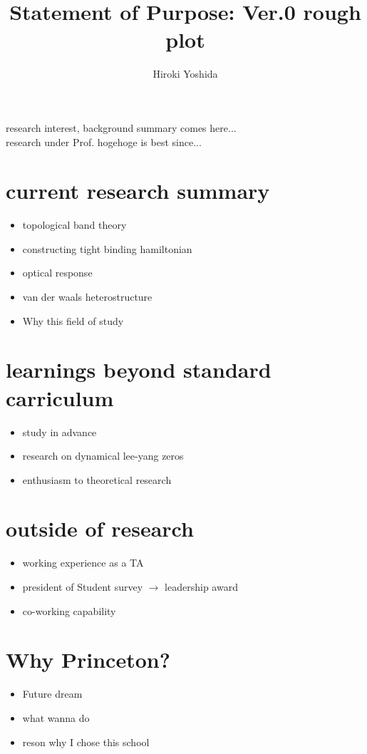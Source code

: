 \documentclass[a4]{article}
\title{Statement of Purpose: Ver.0 rough plot}
\author{Hiroki Yoshida}
\date{}
\begin{document}
\maketitle
research interest, background summary comes here...\\
research under Prof. hogehoge is best since...
\section{current research summary}
\begin{itemize}
  \item topological band theory
  \item constructing tight binding hamiltonian
  \item optical response
  \item van der waals heterostructure
  \item Why this field of study
\end{itemize}

\section{learnings beyond standard carriculum}
\begin{itemize}
  \item study in advance
  \item research on dynamical lee-yang zeros
  \item enthusiasm to theoretical research
\end{itemize}

\section{outside of research}
\begin{itemize}
  \item working experience as a TA
  \item president of Student survey $\rightarrow$ leadership award
  \item co-working capability
\end{itemize}

\section{Why Princeton?}
\begin{itemize}
  \item Future dream
  \item what wanna do
  \item reson why I chose this school
\end{itemize}
\end{document}
